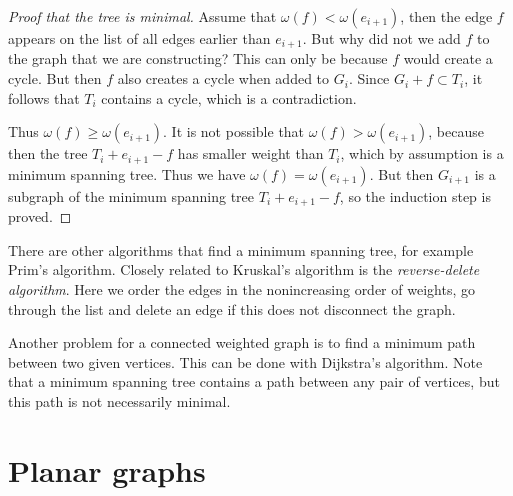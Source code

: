 \begin{page}
\begin{proof}[Proof that the tree is minimal]
Assume that $\omega(f) < \omega(e_{i+1})$, then the edge $f$ appears on the list of all edges earlier than $e_{i+1}$.
But why did not we add $f$ to the graph that we are constructing?
This can only be because $f$ would create a cycle.
But then $f$ also creates a cycle when added to $G_i$.
Since $G_i + f \subset T_i$, it follows that $T_i$ contains a cycle, which is a contradiction.

Thus $\omega(f) \ge \omega(e_{i+1})$.
It is not possible that $\omega(f) > \omega(e_{i+1})$, because then the tree $T_i + e_{i+1} - f$ has smaller weight than $T_i$,
which by assumption is a minimum spanning tree.
Thus we have $\omega(f) = \omega(e_{i+1})$.
But then $G_{i+1}$ is a subgraph of the minimum spanning tree $T_i + e_{i+1} - f$, so the induction step is proved.
\end{proof}



\end{page}

\begin{page}
\setcounter{section}{2}
\setcounter{subsection}{6}
\setcounter{dfn}{19}
\label{portion:269}

\begin{rem}
There are other algorithms that find a minimum spanning tree, for example Prim's algorithm.
Closely related to Kruskal's algorithm is the \emph{reverse-delete algorithm}.
Here we order the edges in the nonincreasing order of weights, go through the list
and delete an edge if this does not disconnect the graph.
\end{rem}

\end{page}

\begin{page}
\setcounter{section}{2}
\setcounter{subsection}{6}
\setcounter{dfn}{20}
\label{portion:272}

\begin{rem}
Another problem for a connected weighted graph is to find a minimum path between two given vertices.
This can be done with Dijkstra's algorithm.
Note that a minimum spanning tree contains a path between any pair of vertices, but this path is not necessarily minimal.
\end{rem}

\end{page}

\begin{page}
\setcounter{section}{3}
\setcounter{subsection}{1}
\setcounter{dfn}{0}
\label{portion:274}

\section{Planar graphs}

\end{page}

